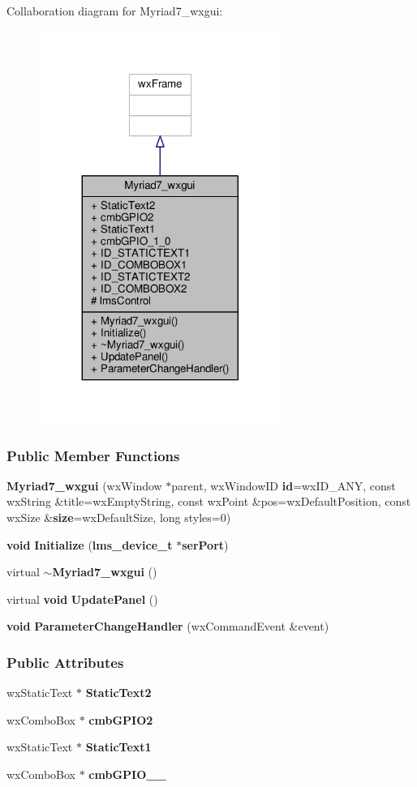 Collaboration diagram for Myriad7\+\_\+wxgui\+:
\nopagebreak
\begin{figure}[H]
\begin{center}
\leavevmode
\includegraphics[width=224pt]{d7/d5d/classMyriad7__wxgui__coll__graph}
\end{center}
\end{figure}
\subsubsection*{Public Member Functions}
\begin{DoxyCompactItemize}
\item 
{\bf Myriad7\+\_\+wxgui} (wx\+Window $\ast$parent, wx\+Window\+ID {\bf id}=wx\+I\+D\+\_\+\+A\+NY, const wx\+String \&title=wx\+Empty\+String, const wx\+Point \&pos=wx\+Default\+Position, const wx\+Size \&{\bf size}=wx\+Default\+Size, long styles=0)
\item 
{\bf void} {\bf Initialize} ({\bf lms\+\_\+device\+\_\+t} $\ast${\bf ser\+Port})
\item 
virtual {\bf $\sim$\+Myriad7\+\_\+wxgui} ()
\item 
virtual {\bf void} {\bf Update\+Panel} ()
\item 
{\bf void} {\bf Parameter\+Change\+Handler} (wx\+Command\+Event \&event)
\end{DoxyCompactItemize}
\subsubsection*{Public Attributes}
\begin{DoxyCompactItemize}
\item 
wx\+Static\+Text $\ast$ {\bf Static\+Text2}
\item 
wx\+Combo\+Box $\ast$ {\bf cmb\+G\+P\+I\+O2}
\item 
wx\+Static\+Text $\ast$ {\bf Static\+Text1}
\item 
wx\+Combo\+Box $\ast$ {\bf cmb\+G\+P\+I\+O\+\_\+\_}
\end{DoxyCompactItemize}
